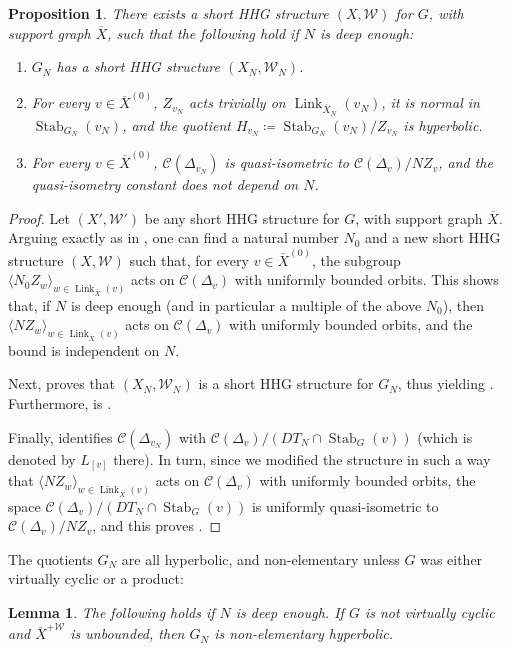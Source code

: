 \documentclass[svgnames]{amsart}
\theoremstyle{plain}
\newtheorem{lem}[thm]{Lemma}
\newtheorem{prop}[thm]{Proposition}
\theoremstyle{definition}
\newcommand{\C}[1]{\mathcal{C}(#1)}
\newcommand{\link}[2]{\operatorname{Link}_{#1}\left(#2\right)}
\newcommand{\W}{\mathcal{W}}
\newcommand{\duaug}[2]{{#1}^{+{#2}}}
\newcommand{\Stab}[2]{\operatorname{Stab}_{#1}\left(#2\right)}
\newcommand{\ov}[1]{\overline{#1}}
\begin{document}
\begin{prop}\label{prop:shortquot_is_short}
    There exists a short HHG structure $(X,\W)$ for $G$, with support graph $\ov X$, such that the following hold if $N$ is deep enough:
\begin{enumerate}[label=(\roman*)]
    \item \label{item:thmshort2:i} $G_N$ has a short HHG structure $(X_N,\W_N)$.
    \item \label{item:thmshort2:ii} For every $v\in \ov X^{(0)}$, $Z_{v_N}$ acts trivially on $\link{\ov X_N}{v_N}$, it is normal in $\Stab{G_N}{v_N}$, and the quotient $H_{v_N}\coloneq \Stab{G_N}{v_N}/Z_{v_N}$ is hyperbolic.
    \item \label{item:thmshort2:iii} For every $v\in \ov X^{(0)}$, $\C{\Delta_{v_N}}$ is quasi-isometric to $\C{\Delta_v}/NZ_v$, and the quasi-isometry constant does not depend on $N$.
    \end{enumerate}
\end{prop}
\begin{proof} Let $(X',\W')$ be any short HHG structure for $G$, with support graph $\ov X$. Arguing exactly as in \cite[Section 4.1]{short_HHG:II}, one can find a natural number $N_0$ and a new short HHG structure $(X,\W)$ such that, for every $v\in \ov X^{(0)}$, the subgroup $\langle N_0Z_w\rangle_{w\in\link{\ov X}{v}}$ acts on $\C{\Delta_v}$ with uniformly bounded orbits. This shows that, if $N$ is deep enough (and in particular a multiple of the above $N_0$), then $\langle NZ_w\rangle_{w\in\link{\ov X}{v}}$ acts on $\C{\Delta_v}$ with uniformly bounded orbits, and the bound is independent on $N$.

    Next, \cite[Theorem 4.1]{short_HHG:II} proves that $(X_N,\W_N)$ is a short HHG structure for $G_N$, thus yielding . Furthermore,  is \cite[Lemma 3.42]{short_HHG:II}.
    
    Finally, \cite[Lemma 4.15]{short_HHG:II} identifies $\C{\Delta_{v_N}}$ with $\C{\Delta_v}/(DT_N\cap \Stab{G}{v})$ (which is denoted by $L_{[v]}$ there). In turn, since we modified the structure in such a way that $\langle NZ_w\rangle_{w\in\link{\ov X}{v}}$ acts on $\C{\Delta_v}$ with uniformly bounded orbits, the space $\C{\Delta_v}/(DT_N\cap \Stab{G}{v})$ is uniformly quasi-isometric to $\C{\Delta_v}/NZ_v$, and this proves . 
\end{proof}

\noindent The quotients $G_N$ are all hyperbolic, and non-elementary unless $G$ was either virtually cyclic or a product:
\begin{lem}\label{lem:nonelm_hyp_short_quot}
    The following holds if $N$ is deep enough. If $G$ is not virtually cyclic and $\duaug{\ov X}{\W}$ is unbounded, then $G_N$ is non-elementary hyperbolic.
\end{lem}
\end{document}
